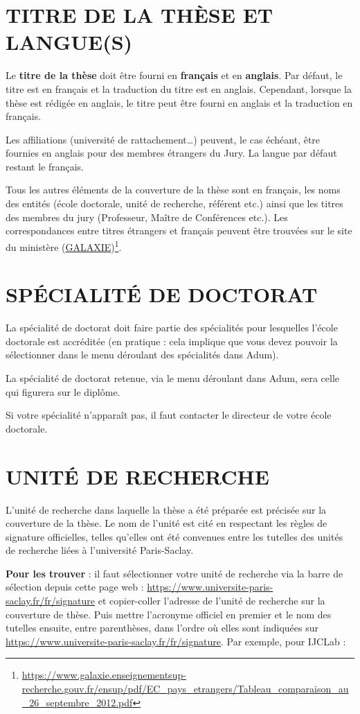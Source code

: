 \documentclass[french,12pt,a4paper]{book}
\begin{document}
\section{TITRE DE LA THÈSE ET LANGUE(S)}
Le \textbf{titre de la thèse} doit être fourni en \textbf{français} et en \textbf{anglais}. Par défaut, le titre est en français et la traduction du titre est en anglais. Cependant, lorsque la thèse est rédigée en anglais, le titre peut être fourni en anglais et la traduction en français.\\ \par
Les affiliations (université de rattachement…) peuvent, le cas échéant, être fournies en anglais pour des membres étrangers du Jury. La langue par défaut restant le français.\\ \par
Tous les autres éléments de la couverture de la thèse sont en français, les noms des entités (école doctorale, unité de recherche, référent etc.) ainsi que les titres des membres du jury (Professeur, Maître de Conférences etc.). Les correspondances entre titres étrangers et français peuvent être trouvées sur le site du ministère (\href{https://www.galaxie.enseignementsup-recherche.gouv.fr/ensup/pdf/EC_pays_etrangers/Tableau_comparaison_au_26_septembre_2012.pdf}{GALAXIE})\footnote{\url{https://www.galaxie.enseignementsup-recherche.gouv.fr/ensup/pdf/EC_pays_etrangers/Tableau_comparaison_au_26_septembre_2012.pdf}}.
\section{SPÉCIALITÉ DE DOCTORAT}
La spécialité de doctorat doit faire partie des spécialités pour lesquelles l’école doctorale est accréditée (en pratique : cela implique que vous devez pouvoir la sélectionner dans le menu déroulant des spécialités dans Adum). \\ \par
La spécialité de doctorat retenue, via le menu déroulant dans Adum, sera celle qui figurera sur le diplôme.\\ \par
Si votre spécialité n’apparaît pas, il faut contacter le directeur de votre école doctorale.
\newpage
\section{UNITÉ DE RECHERCHE}
L’unité de recherche dans laquelle la thèse a été préparée est précisée sur la couverture de la thèse. Le nom de l’unité est cité en respectant les règles de signature officielles, telles qu’elles ont été convenues entre les tutelles des unités de recherche liées à l’université Paris-Saclay.\\ \par
\textbf{Pour les trouver} : il faut sélectionner votre unité de recherche via la barre de sélection depuis cette page web : \url{https://www.universite-paris-saclay.fr/fr/signature} et copier-coller l’adresse de l’unité de recherche sur la couverture de thèse. 
Puis mettre l’acronyme officiel en  premier et le nom des tutelles ensuite, entre parenthèses, dans l’ordre où elles sont indiquées sur \url{https://www.universite-paris-saclay.fr/fr/signature}.
Par exemple, pour IJCLab :
\end{document}
